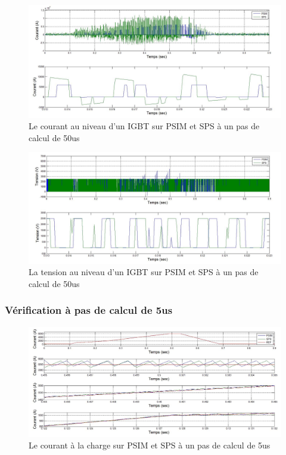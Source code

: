 \documentclass[11pt,letterpaper,final]{report}
\begin{document}
\begin{figure}[h!]
\centering
\includegraphics[scale=0.5]{Fig/DCPDCN/DCPCourantIGBT50u.jpg}
\caption{Le courant au niveau d'un IGBT sur PSIM et SPS à un pas de calcul de 50us}
\label{DC_IG_cou_50}
\end{figure}

\begin{figure}[h!]
\centering
\includegraphics[scale=0.5]{Fig/DCPDCN/DCPTensionIGBT50u.jpg}
\caption{La tension au niveau d'un IGBT sur PSIM et SPS à un pas de calcul de 50us}
\label{DC_IG_ten_50}
\end{figure}


\clearpage

\subsubsection{Vérification à pas de calcul de 5us}

\begin{figure}[h!]
\centering
\includegraphics[scale=0.5]{Fig/DCPDCN/DCPCourantCharge5u.jpg}
\caption{Le courant à la charge sur PSIM et SPS à un pas de calcul de 5us}
\label{DC_ch_cou_5}
\end{figure}
\end{document}
